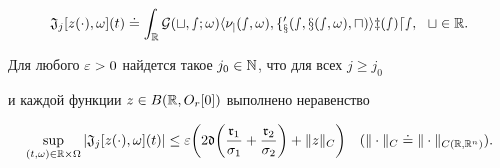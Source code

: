 \begin{equation}


\frak J_{j}[z(\cdot),\om](t)\doteq\int_{\R}\cal G(t,s;\omega)


\la\nu_{j}(s,\om),f'_{x}(s,x(s,\om),u)\ra z(s)ds,\ \ t\in\R.


\end{equation}





\begin{lems}


Для любого $\varepsilon>0$ найдется такое $j_{0}\in\Bbb N$, что для всех $j\ge j_{0}$


и каждой функции $z\in B(\Bbb R,O_{r}[0])$ выполнено неравенство


\begin{equation}


\sup\lt_{(t,\om)\in\R\times\Om}|\frak J_{j}[z(\cdot),\om](t)|\le


\ve\bigg(2\frak d\bigg(\frac{\frak r_{1}}{\sigma_{1}}+


\frac{\frak r_{2}}{\sigma_{2}}\bigg)+


\|z\|_{C}\bigg)\quad (\|\cdot\|_{C}\doteq\|\cdot\|_{C(\R,\R^{n})}).


\end{equation}


\end{lems}





